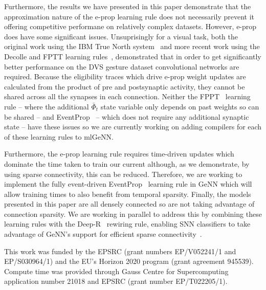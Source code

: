 \documentclass[sigconf]{acmart}
\begin{document}
Furthermore, the results we have presented in this paper demonstrate that the approximation nature of the e-prop learning rule does not necessarily prevent it offering competitive performane on relatively complex datasets.
However, e-prop does have some significant issues.
Unsuprisingly for a visual task, both the original work using the IBM True North system~\citep{amir_low_2017} and more recent work using the Decolle and FPTT learning rules~\citep{Kaiser2020,yin2021accurate}, demonstrated that in order to get significantly better performance on the DVS gesture dataset convolutional networks are required.
Because the eligibility traces which drive e-prop weight updates are calculated from the product of pre and postsynaptic activity, they cannot be shared across all the synapses in each connection.
Neither the FPPT~\citep{yin2021accurate} learning rule -- where the additional $\bar{\Phi}_t$ state variable only depends on past weights so can be shared -- and EventProp~\citep{Wunderlich2021} -- which does not require any additional synaptic state -- have these issues so we are currently working on adding compilers for each of these learning rules to mlGeNN.

Furthermore, the e-prop learning rule requires time-driven updates which dominate the time taken to train our current although, as we demonstrate, by using sparse connectivity, this can be reduced.
Therefore, we are working to implement the fully event-driven EventProp~\citep{Wunderlich2021} learning rule in GeNN which will allow training times to also benefit from temporal sparsity.
Finally, the models presented in this paper are all densely connected so are not taking advantage of connection sparsity.
We are working in parallel to address this by combining these learning rules with the Deep-R~\citep{Bellec2018a} rewiring rule, enabling SNN classifiers to take advantage of GeNN's support for efficient sparse connectivity~\citep{Knight2018}.


\begin{acks}
This work was funded by the EPSRC (grant numbers EP/V052241/1 and EP/S030964/1) and the EU's Horizon 2020 program (grant agreement 945539).
Compute time was provided through Gauss Centre for Supercomputing application number 21018 and EPSRC (grant number EP/T022205/1).
\end{acks}

\balance


\end{document}
